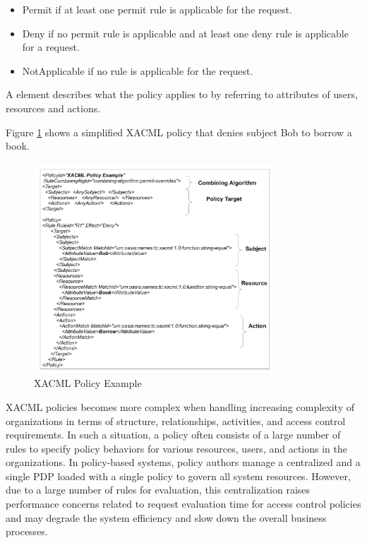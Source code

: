 \begin{itemize}
\item Permit if at least one permit rule is applicable for the request.
\item Deny if no permit rule is applicable and at least one deny rule is applicable for a request.
\item NotApplicable if no rule is applicable for the request.
\end{itemize}

A  element describes what the policy applies to by referring to attributes of users, resources and actions.

Figure \ref{figur1} shows a simplified XACML policy that denies subject Bob to borrow a book.

\begin{figure}[!h]
\begin{center}
\includegraphics[width=9cm]{xacml}
\caption{XACML Policy Example}
\label{figur1}
\end{center}
\end{figure}


XACML policies becomes more complex when handling increasing complexity of organizations in terms of structure, relationships, activities, and access control requirements. In such a situation, a policy 
often consists of a large number of rules to specify policy behaviors for various resources, users, and actions in the organizations.
In policy-based systems, policy authors manage a centralized and a single PDP loaded with a single policy to govern all system resources. 
However, due to a large number of rules for evaluation, this centralization raises performance concerns related to request evaluation time for access control policies and may 
degrade the system efficiency and slow down the overall business processes. 


